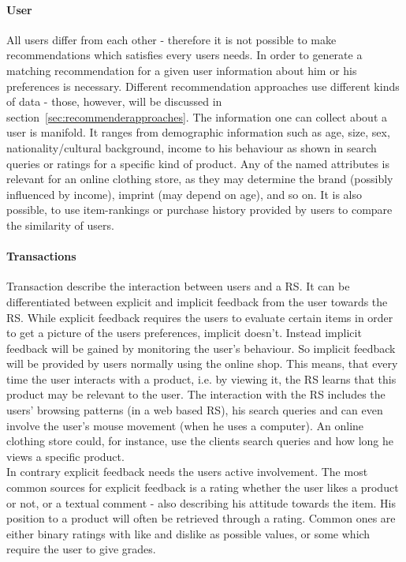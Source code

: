 \paragraph{User}
All users differ from each other - therefore it is not possible to make recommendations which satisfies every users needs.
In order to generate a matching recommendation for a given user information about him or his preferences is necessary.
Different recommendation approaches use different kinds of data - those, however, will be discussed in section~\ref{sec:recommenderapproaches}.
The information one can collect about a user is manifold.
It ranges from demographic information such as age, size, sex, nationality/cultural background, income to his behaviour as shown in search queries or ratings for a specific kind of product.
Any of the named attributes is relevant for an online clothing store, as they may determine the brand (possibly influenced by income), imprint (may depend on age), and so on.\citep[p.8-9]{ricci:2011}
It is also possible, to use item-rankings or purchase history provided by users to compare the similarity of users.\citep[p.~377-378]{pradel:2011}

\paragraph{Transactions}
\label{sec:feedback}
Transaction describe the interaction between users and a RS.\citep[p.~9]{ricci:2011}
It can be differentiated between explicit and implicit feedback from the user towards the RS.
While explicit feedback requires the users to evaluate certain items in order to get a picture of the users preferences, implicit doesn't.
Instead implicit feedback will be gained by monitoring the user's behaviour.\citep[p.~76-77]{lops:2011}
So implicit feedback will be provided by users normally using the online shop.
This means, that every time the user interacts with a product, i.e. by viewing it, the RS learns that this product may be relevant to the user.\citep{taghipour:2007}
The interaction with the RS includes the users' browsing patterns (in a web based RS), his search queries and can even involve the user's mouse movement (when he uses a computer).\citep[p.~146]{koren:2011}
An online clothing store could, for instance, use the clients search queries and how long he views a specific product.
\\
In contrary explicit feedback needs the users active involvement.
The most common sources for explicit feedback is a rating whether the user likes a product or not, or a textual comment - also describing his attitude towards the item.
His position to a product will often be retrieved through a rating.
Common ones are either binary ratings with like and dislike as possible values, or some which require the user to give grades.\citep[p.~77]{lops:2011}

